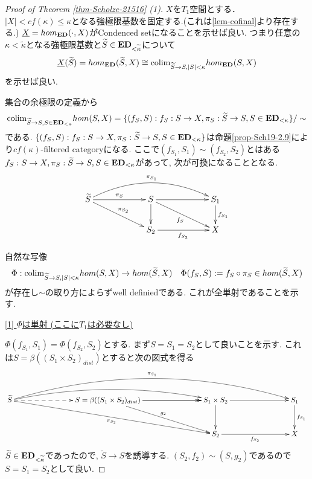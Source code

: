 \documentclass[dvipdfmx,a4paper,11pt]{article}
\newcommand{\colim}{{\rm colim}}
\theoremstyle{definition}
\begin{document}
\begin{proof}[Proof of Theorem \ref{thm-Scholze-21516} (1)]
$X$を$T_1$空間とする． 
$|X| < cf(\kappa) \le \kappa$となる強極限基数を固定する.(これは\ref{lem-cofinal}より存在する.)
$\underline{X} = hom_{{\bf ED}}(\cdot, X)$がCondenced setになることを示せば良い.
つまり任意の$\kappa<\widetilde{\kappa}$となる強極限基数と$\widetilde{S} \in {\bf ED}_{< \widetilde{\kappa}}$について
$$
\underline{X}(\widetilde{S})=hom_{{\bf ED}}(\widetilde{S}, X)
\cong
\colim_{\widetilde{S} \to S, |S|<\kappa}hom_{{\bf ED}}(S,X)
$$
を示せば良い.

集合の余極限の定義から
$$
\colim_{\widetilde{S} \to S, S \in {\bf ED}_{<\kappa}}hom(S,X)
=
\{ (f_{S}, S) : f_S : S \to X, \pi_{S}: \widetilde{S} \to S, S \in {\bf ED}_{<\kappa}\}/\sim
$$
である.
$\{ (f_{S}, S) : f_S : S \to X, \pi_{S}: \widetilde{S} \to S, S \in {\bf ED}_{<\kappa}\}
$は命題\ref{prop-Sch19-2.9}により$cf(\kappa)$-filtered categoryになる. 
ここで$(f_{S_1}, S_1) \sim (f_{S_2}, S_2)$とはある$f_S : S \to X, \pi_{S}: \widetilde{S} \to S, S \in {\bf ED}_{<\kappa}$があって, 次が可換になることとなる.
\begin{equation*}
\xymatrix@C=60pt@R=20pt{
\widetilde{S}\ar@{->}[r]^{\pi_S} \ar@/^20pt/[rr]^{\pi_{S_{1}}}\ar@{->}[rd]^{\pi_{S_2}}
&S\ar@{->}[d]  \ar@{->}[r] \ar@{->}[rd]_{f_S}
& S_1\ar@{->}[d]^{f_{S_1}}
\\
&S_2 \ar@{->}[r]_{f_{S_2}} 
&X
 \\   
}
\end{equation*}

自然な写像
\begin{equation}
\Phi : \colim_{\widetilde{S} \to S, |S|<\kappa}hom(S,X)
\to hom(\widetilde{S}, X)
\quad
\Phi(f_{S}, S):=  f_S \circ \pi_S \in hom(\widetilde{S}, X)
\end{equation}
が存在し$\sim$の取り方によらずwell definiedである.
これが全単射であることを示す.

\underline{[1] $\Phi$は単射 (ここに$T_1$は必要なし) }

$\Phi(f_{S_1}, S_1) = \Phi(f_{S_2}, S_2)$とする.
まず$S=S_1=S_2$として良いことを示す. 
これは$S = \beta((S_1 \times S_2)_{dist})$とすると次の図式を得る
\begin{equation*}
\xymatrix@C=80pt@R=30pt{
\widetilde{S}\ar@{-->}[r] \ar@/^30pt/[rrr]^{\pi_{S_{1}}}
\ar@/^15pt/[rr]\ar@{->}[rrd]_{\pi_{S_2}}
& S=\beta((S_1 \times S_2)_{dist})
\ar@{->}[r] \ar@{->>}[r]\ar@{->}[rd]^{g_2}
&S_1 \times S_2\ar@{->}[d]  \ar@{->}[r] 
& S_1\ar@{->}[d]^{f_{S_1}}
\\
&
&S_2 \ar@{->}[r]_{f_{S_2}} 
&X
 \\   
}
\end{equation*} 
$\widetilde{S} \in {\bf ED}_{< \widetilde{\kappa}}$であったので, 
$\widetilde{S} \to S$を誘導する.
$(S_2,f_2) \sim (S, g_2)$であるので$S=S_1=S_2$として良い.


\end{proof}
\end{document}
